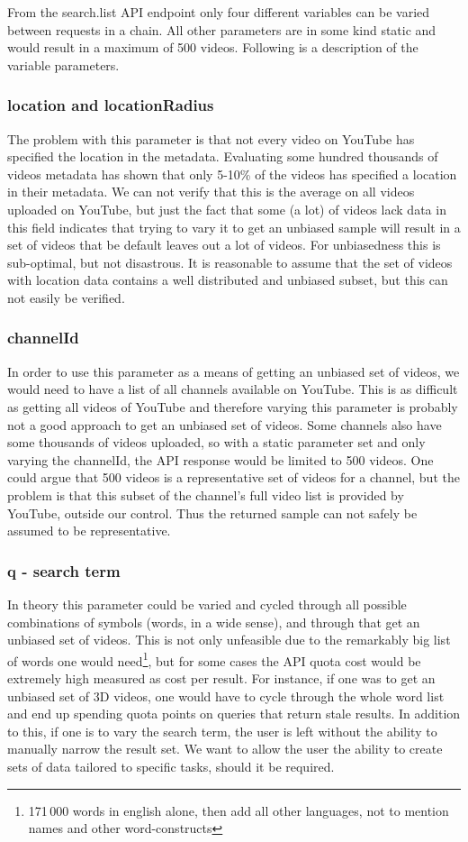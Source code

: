 From the search.list API endpoint only four different variables can be varied 
between requests in a chain. All other parameters are in some kind static and
would result in a maximum of 500 videos. Following is a description of the
variable parameters.

\subsubsection{location and locationRadius}
The problem with this parameter is that not every video on YouTube has specified
the location in the metadata. Evaluating some hundred thousands of videos
metadata has shown that only 5-10\% of the videos has specified a location in
their metadata. We can not verify that this is the average on all videos
uploaded on YouTube, but just the fact that some (a lot) of videos lack data in
this field indicates that trying to vary it to get an unbiased sample will
result in a set of videos that be default leaves out a lot of videos. For
unbiasedness this is sub-optimal, but not disastrous. It is reasonable to
assume that the set of videos with location data contains a well distributed
and unbiased subset, but this can not easily be verified.

\subsubsection{channelId}
In order to use this parameter as a means of getting an unbiased set of videos,
we would need to have a list of all channels available on YouTube. This is as
difficult as getting all videos of YouTube and therefore varying this parameter 
is probably not a good approach to get an unbiased set of videos. Some channels
also have some thousands of videos uploaded, so with a static parameter set and
only varying the channelId, the API response would be limited to 500 videos. One
could argue that 500 videos is a representative set of videos for a channel, but
the problem is that this subset of the channel's full video list is provided by
YouTube, outside our control. Thus the returned sample can not safely be assumed
to be representative.

\subsubsection{q - search term}
In theory this parameter could be varied and cycled through all possible
combinations of symbols (words, in a wide sense), and through that get an
unbiased set of videos. This is not only unfeasible due to the remarkably big
list of words one would need\footnote{171\,000 words in english alone, then add
all other languages, not to mention names and other word-constructs}, but for
some cases the API quota cost would be extremely high measured as cost per
result. For instance, if one was to get an unbiased set of 3D videos, one would
have to cycle through the whole word list and end up spending quota points on queries
that return stale results. In addition to this, if one is to vary the
search term, the user is left without the ability to manually narrow the result
set. We want to allow the user the ability to create sets of data tailored to
specific tasks, should it be required.

